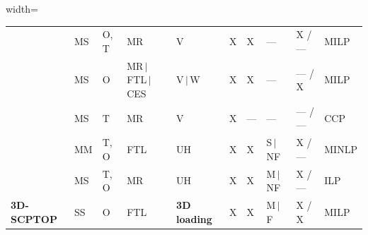 \begin{table}[!htbp]
\begin{adjustbox}{width=\textwidth}
\begin{tabular}{llllllllll}
    \autocite{Chitsaz2019ARouting}              & MS & O, T& MR                       & V        & X & X    & ---      & X / ---  & MILP   \\
    \autocite{Baller2022OptimizingApproach}     & MS & O   & MR\,$|$\,FTL\,$|$\,CES   & V\,$|$\,W& X & X    & ---      & --- / X  & MILP   \\
    \autocite{Hashemi-Amiri2023IntegratedApproach}& MS & T & MR                       & V        & X & ---  & ---      & --- / --- & CCP   \\
    \autocite{GUO2024104339}                    & MM & T, O& FTL                      & UH       & X & X    & S\,$|$\,NF & X / --- & MINLP \\
    \autocite{Zhang17012024}                    & MS & T, O& MR                       & UH       & X & X    & M\,$|$\,NF & X / --- & ILP   \\
    \midrule
    \textbf{3D-SCPTOP}                          & SS & O   & FTL & \textbf{3D loading} & X & X & M\,$|$\,F & X / X & MILP \\
    \bottomrule
  \end{tabular}
  \end{adjustbox}
\end{table}
